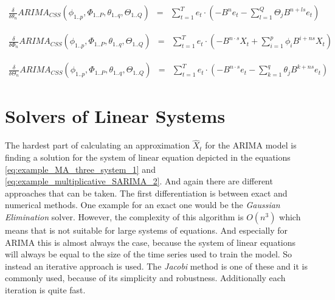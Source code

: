 \begin{equation}\label{eq:gradient_arima_theta}
	\begin{array}{lcl}
		\frac{\delta}{\delta \theta_n} ARIMA_{CSS}(\phi_{1..p}, \Phi_{1..P}, \theta_{1..q}, \Theta_{1..Q}) &=& \displaystyle\sum_{t=1}^{T} e_t \cdot  (-B^n e_t - \displaystyle\sum_{l=1}^{Q} \Theta_j B^{n + ls} e_t)
	\end{array}
\end{equation}

\begin{equation}\label{eq:gradient_arima_Phi}
	\begin{array}{lcl}
		\frac{\delta}{\delta \Phi_n} ARIMA_{CSS}(\phi_{1..p}, \Phi_{1..P}, \theta_{1..q}, \Theta_{1..Q}) &=& \displaystyle\sum_{t=1}^{T} e_t \cdot  (-B^{n \cdot s} X_t + \displaystyle\sum_{i=1}^{p} \phi_i B^{i + ns} X_t)
	\end{array}
\end{equation}

\begin{equation}\label{eq:gradient_arima_Theta}
	\begin{array}{lcl}
		\frac{\delta}{\delta \Theta_n} ARIMA_{CSS}(\phi_{1..p}, \Phi_{1..P}, \theta_{1..q}, \Theta_{1..Q}) &=& \displaystyle\sum_{t=1}^{T} e_t \cdot  (-B^{n \cdot s} e_t - \displaystyle\sum_{k=1}^{q} \theta_j B^{k +ns} e_t)
	\end{array}
\end{equation}


\section{Solvers of Linear Systems}\label{linsys_solvers}

The hardest part of calculating an approximation $\hat{X}_t$ for the \acs{ARIMA} model is finding a solution for the system of linear equation depicted in the equations \eqref{eq:example_MA_three_system_1} and \eqref{eq:example_multiplicative_SARIMA_2}.
And again there are different approaches that can be taken. The first differentiation is between exact and numerical methods. One example for an exact one would be the \textit{ Gaussian Elimination} solver. However, the complexity of this algorithm is $O(n^3)$ which means that is not suitable for large systems of equations. And especially for \acs{ARIMA} this is almost always the case, because the system of linear equations will always be equal to the size of the time series used to train the model. So instead an iterative approach is used. The \textit{Jacobi} method is one of these and it is commonly used, because of its simplicity and robustness. Additionally each iteration is quite fast. 


